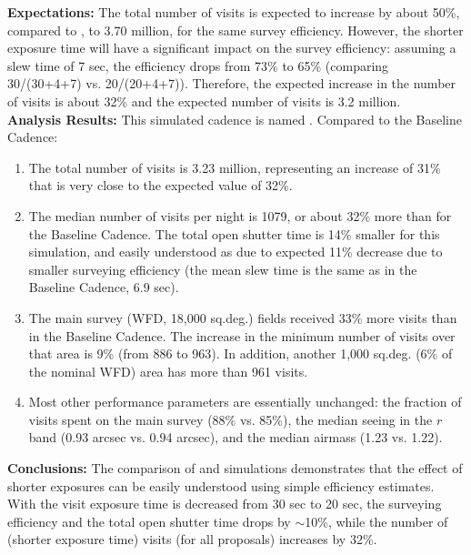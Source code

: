 {\bf Expectations:} The total number of visits is expected to increase
by about 50\%, compared to , to 3.70 million,
for the same survey efficiency. However, the shorter exposure time
will have a significant impact on the survey efficiency: assuming a
slew time of 7 sec, the efficiency drops from 73\% to 65\% (comparing
30/(30+4+7) vs. 20/(20+4+7)). Therefore, the expected increase in the
number of visits is about 32\% and the expected number of visits is
3.2 million.  \\

{\bf Analysis Results:}  This simulated cadence is named
. Compared to the Baseline Cadence:
\begin{enumerate}
\item The total number of visits is 3.23 million, representing an
increase of 31\% that is very close to the expected value of 32\%.
\item The median number of visits per night is 1079, or about 32\%
more than for the Baseline Cadence. The total open shutter time is 14\%
smaller for this simulation, and easily understood as due to expected
11\% decrease due to smaller surveying efficiency (the mean slew time
is the same as in the Baseline Cadence, 6.9 sec).
\item The main survey (WFD, 18,000 sq.deg.) fields received 33\% more
visits than in the Baseline Cadence. The increase in the minimum number of
visits over that area is 9\% (from 886 to 963). In addition, another
1,000 sq.deg. (6\% of the nominal WFD) area has more than 961 visits.
\item Most other performance parameters are essentially unchanged: the
fraction of visits spent on the main survey (88\% vs. 85\%), the
median seeing in the $r$ band (0.93 arcsec vs. 0.94 arcsec), and the
median airmass (1.23 vs. 1.22).
\end{enumerate}

{\bf Conclusions:}
The comparison of  and
 simulations demonstrates that the effect of
shorter exposures can be easily understood using simple efficiency
estimates. With the visit exposure time is decreased from 30 sec to 20
sec, the surveying efficiency and the total open shutter time drops by
$\sim$10\%, while the number of (shorter exposure time) visits (for
all proposals) increases by 32\%.




